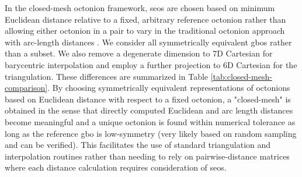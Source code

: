 \documentclass[preprint,12pt]{elsarticle}
\begin{document}
In the closed-mesh octonion framework, \glspl{seo} are chosen based on minimum Euclidean distance relative to a fixed, arbitrary reference octonion rather than allowing either octonion in a pair to vary in the traditional octonion approach with arc-length distances \cite{Francis2019ABoundaries}. We consider all symmetrically equivalent \glspl{gbo} rather than a subset. We also remove a degenerate dimension to 7D Cartesian for barycentric interpolation and employ a further projection to 6D Cartesian for the triangulation. These differences are summarized in Table \ref{tab:closed-mesh-comparison}. By choosing symmetrically equivalent representations of octonions based on Euclidean distance with respect to a fixed octonion, a "closed-mesh" is obtained in the sense that directly computed Euclidean and arc length distances become meaningful and a unique octonion is found within numerical tolerance as long as the reference \gls{gbo} is low-symmetry (very likely based on random sampling and can be verified). This facilitates the use of standard triangulation and interpolation routines rather than needing to rely on pairwise-distance matrices where each distance calculation requires consideration of \glspl{seo}.

  
\end{document}
